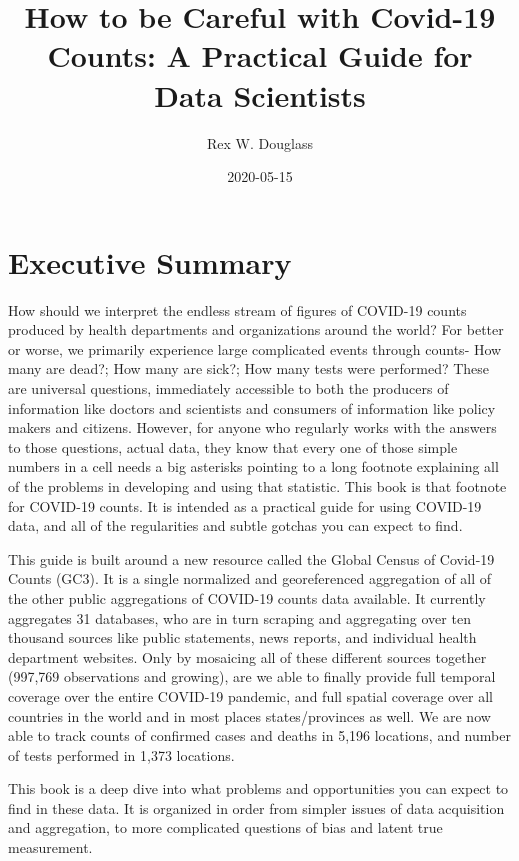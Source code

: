 \documentclass[
]{book}
\title{How to be Careful with Covid-19 Counts: A Practical Guide for Data Scientists}
\author{Rex W. Douglass}
\date{2020-05-15}
\begin{document}
\maketitle

{
\setcounter{tocdepth}{1}
\tableofcontents
}
\hypertarget{index}{%
\chapter{Executive Summary}\label{index}}

How should we interpret the endless stream of figures of COVID-19 counts produced by health departments and organizations around the world? For better or worse, we primarily experience large complicated events through counts- How many are dead?; How many are sick?; How many tests were performed? These are universal questions, immediately accessible to both the producers of information like doctors and scientists and consumers of information like policy makers and citizens. However, for anyone who regularly works with the answers to those questions, actual data, they know that every one of those simple numbers in a cell needs a big asterisks pointing to a long footnote explaining all of the problems in developing and using that statistic. This book is that footnote for COVID-19 counts. It is intended as a practical guide for using COVID-19 data, and all of the regularities and subtle gotchas you can expect to find.

This guide is built around a new resource called the Global Census of Covid-19 Counts (GC3). It is a single normalized and georeferenced aggregation of all of the other public aggregations of COVID-19 counts data available. It currently aggregates 31 databases, who are in turn scraping and aggregating over ten thousand sources like public statements, news reports, and individual health department websites. Only by mosaicing all of these different sources together (997,769 observations and growing), are we able to finally provide full temporal coverage over the entire COVID-19 pandemic, and full spatial coverage over all countries in the world and in most places states/provinces as well. We are now able to track counts of confirmed cases and deaths in 5,196 locations, and number of tests performed in 1,373 locations.

This book is a deep dive into what problems and opportunities you can expect to find in these data. It is organized in order from simpler issues of data acquisition and aggregation, to more complicated questions of bias and latent true measurement.
\end{document}
